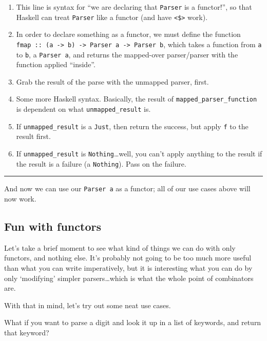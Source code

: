 \documentclass[]{article}
\begin{document}
\begin{enumerate}
\def\labelenumi{\arabic{enumi}.}
\tightlist
\item
  This line is syntax for ``we are declaring that \texttt{Parser} is a
  functor!'', so that Haskell can treat \texttt{Parser} like a functor (and have
  \texttt{\textless{}\$\textgreater{}} work).
\item
  In order to declare something as a functor, we must define the function
  \texttt{fmap\ ::\ (a\ -\textgreater{}\ b)\ -\textgreater{}\ Parser\ a\ -\textgreater{}\ Parser\ b},
  which takes a function from \texttt{a} to \texttt{b}, a \texttt{Parser\ a},
  and returns the mapped-over parser/parser with the function applied
  ``inside''.
\item
  Grab the result of the parse with the unmapped parser, first.
\item
  Some more Haskell syntax. Basically, the result of
  \texttt{mapped\_parser\_function} is dependent on what
  \texttt{unmapped\_result} is.
\item
  If \texttt{unmapped\_result} is a \texttt{Just}, then return the success, but
  apply \texttt{f} to the result first.
\item
  If \texttt{unmapped\_result} is \texttt{Nothing}\ldots well, you can't apply
  anything to the result if the result is a failure (a \texttt{Nothing}). Pass
  on the failure.
\end{enumerate}

\begin{center}\rule{0.5\linewidth}{0.5pt}\end{center}

And now we can use our \texttt{Parser\ a} as a functor; all of our use cases
above will now work.

\subsection{Fun with functors}\label{fun-with-functors}

Let's take a brief moment to see what kind of things we can do with only
functors, and nothing else. It's probably not going to be too much more useful
than what you can write imperatively, but it is interesting what you can do by
only `modifying' simpler parsers\ldots which is what the whole point of
combinators are.

With that in mind, let's try out some neat use cases.

What if you want to parse a digit and look it up in a list of keywords, and
return that keyword?
\end{document}
